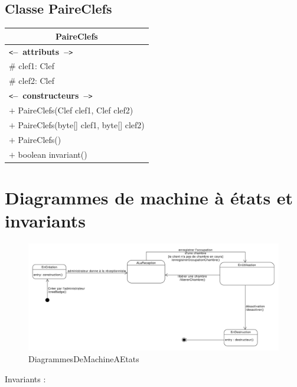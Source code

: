 \documentclass[11pt,article]{article}
\newcommand{\cmt}[1]{\texttt{<}\textbf{--~#1~--}\texttt{>}}
\begin{document}
  \subsection{Classe \textsf{PaireClefs}}
  \begin{center}
	  \begin{longtable}{|p{15cm}|}
		  \hline
		  \multicolumn{1}{|c|}{{\Large \textsf{PaireClefs}}} \\
		  \hline
		  \cmt{attributs}\\
		  $\#$ clef1: Clef \\
		  $\#$ clef2: Clef \\
		  \hline
		  \cmt{constructeurs} \\
          $+$ PaireClefs(Clef clef1, Clef clef2) \\
		  $+$ PaireClefs(byte[] clef1, byte[] clef2) \\
          $+$ PaireClefs() \\
		  $+$ boolean invariant() \\
		  \hline
	  \end{longtable}
  \end{center}


\section{Diagrammes de machine à états et invariants}


\begin{figure}[h!]
  \includegraphics[width=1.3\textwidth,center]{DiagrammesDeMachineAEtats/badge_d_acces}
  \caption{DiagrammesDeMachineAEtats}
  \label{badge_d_acces}

\end{figure}
\bigskip



Invariants :
\bigskip
\end{document}
